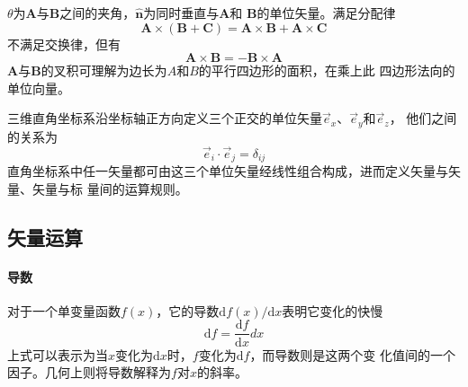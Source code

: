 \begin{enumerate}
\begin{equation}
            \label{eq:vec-vec-cross}
          \end{equation}
          $\theta$为$\bm{A}$与$\bm{B}$之间的夹角，$\hat{\bm{n}}$为同时垂直与$\bm{A}$和
          $\bm{B}$的单位矢量。满足分配律
          \begin{equation}
              \bm{A} \times(\bm{B} + \bm{C}) = \bm{A}\times \bm{B} + \bm{A}\times \bm{C}
            \label{eq:vec-vec-cross-distri}
          \end{equation}
          不满足交换律，但有
          \begin{equation}
              \bm{A} \times \bm{B} = - \bm{B} \times \bm{A}
            \label{eq:vec-vec-cross-exchange}
          \end{equation}
          $\bm{A}$与$\bm{B}$的叉积可理解为边长为$A$和$B$的平行四边形的面积，在乘上此
          四边形法向的单位向量。
\end{enumerate}

三维直角坐标系沿坐标轴正方向定义三个正交的单位矢量$\vec{e}_x$、$\vec{e}_y$和$\vec{e}_z$，
他们之间的关系为
\begin{equation}
        \vec{e}_{i} \cdot  \vec{e}_{j} = \delta_{ij}
    \label{eq:vec-cartesian}
\end{equation}
直角坐标系中任一矢量都可由这三个单位矢量经线性组合构成，进而定义矢量与矢量、矢量与标
量间的运算规则。

\subsection{矢量运算}
\paragraph*{导数}
对于一个单变量函数$f(x)$，它的导数$\mathrm{d} f(x)/ \mathrm{d} x$表明它变化的快慢
\begin{equation}
    \mathrm{d} f = \frac{\mathrm{d} f}{\mathrm{d} x} dx
    \label{eq:vec-derivative}
\end{equation}
上式可以表示为当$x$变化为$\mathrm{d}x$时，$f$变化为$\mathrm{d}f$，而导数则是这两个变
化值间的一个因子。几何上则将导数解释为$f$对$x$的斜率。

